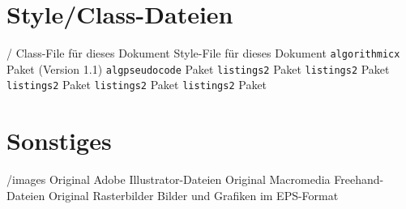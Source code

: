\begin{comment}
\section{Dokumentation}
\begin{FileList}{/docs/}
\fitem{caption2.pdf}  \texttt{caption} Paket %
\fitem{fancyhdr.pdf} "`Fancy Headers"' Paket %
\fitem{float.pdf}     \texttt{float}
Paket \fitem{gerdoc.pdf}    Kurzbeschreibung zu \texttt{german.sty}
und \texttt{ngerman.sty} \fitem{grfguide.pdf}  \texttt{graphicx} Paket
\fitem{l2kurz.pdf}    \latex-Anleitung (deutsch)
\fitem{lshort.pdf}    \latex-Anleitung (englisch)
\fitem{subfigure.pdf} \texttt{subfigure} Paket
\fitem{symbols-a4.pdf} Verzeichnis aller \latex-Symbole
\end{FileList}
\end{comment}

\section{Style/Class-Dateien}
\begin{FileList}{/}
 Class-File für dieses Dokument
 Style-File für dieses Dokument
  \texttt{algorithmicx} Paket (Version 1.1) 
 \texttt{algpseudocode} Paket 
 \texttt{listings2} Paket 
 \texttt{listings2} Paket 
 \texttt{listings2} Paket 
 \texttt{listings2} Paket 
 \texttt{listings2} Paket 
\end{FileList}


\section{Sonstiges}
\begin{FileList}{/images}
 Original Adobe Illustrator-Dateien %
 Original Macromedia Freehand-Dateien %
 Original Rasterbilder %
 Bilder und Grafiken im EPS-Format%
\end{FileList}
